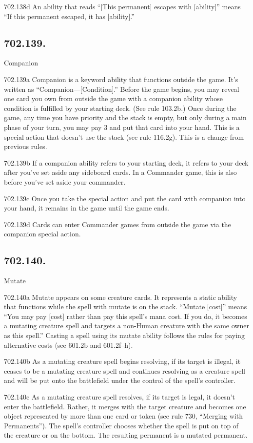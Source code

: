 702.138d An ability that reads “[This permanent] escapes with [ability]” means “If this permanent escaped, it has [ability].”

\subsection*{702.139.}
Companion

702.139a Companion is a keyword ability that functions outside the game. It’s written as “Companion—[Condition].” Before the game begins, you may reveal one card you own from outside the game with a companion ability whose condition is fulfilled by your starting deck. (See rule 103.2b.) Once during the game, any time you have priority and the stack is empty, but only during a main phase of your turn, you may pay {3} and put that card into your hand. This is a special action that doesn’t use the stack (see rule 116.2g). This is a change from previous rules.

702.139b If a companion ability refers to your starting deck, it refers to your deck after you’ve set aside any sideboard cards. In a Commander game, this is also before you’ve set aside your commander.

702.139c Once you take the special action and put the card with companion into your hand, it remains in the game until the game ends.

702.139d Cards can enter Commander games from outside the game via the companion special action.

\subsection*{702.140.}
Mutate

702.140a Mutate appears on some creature cards. It represents a static ability that functions while the spell with mutate is on the stack. “Mutate [cost]” means “You may pay [cost] rather than pay this spell’s mana cost. If you do, it becomes a mutating creature spell and targets a non-Human creature with the same owner as this spell.” Casting a spell using its mutate ability follows the rules for paying alternative costs (see 601.2b and 601.2f–h).

702.140b As a mutating creature spell begins resolving, if its target is illegal, it ceases to be a mutating creature spell and continues resolving as a creature spell and will be put onto the battlefield under the control of the spell’s controller.

702.140c As a mutating creature spell resolves, if its target is legal, it doesn’t enter the battlefield. Rather, it merges with the target creature and becomes one object represented by more than one card or token (see rule 730, “Merging with Permanents”). The spell’s controller chooses whether the spell is put on top of the creature or on the bottom. The resulting permanent is a mutated permanent.

